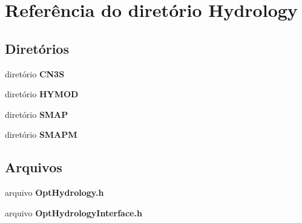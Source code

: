 \section{Referência do diretório Hydrology}
\label{dir_672a907a6201dd0551a98ef786e42bfc}
\subsection*{Diretórios}
\begin{DoxyCompactItemize}
\item 
diretório {\bf C\+N3S}
\item 
diretório {\bf H\+Y\+M\+OD}
\item 
diretório {\bf S\+M\+AP}
\item 
diretório {\bf S\+M\+A\+PM}
\end{DoxyCompactItemize}
\subsection*{Arquivos}
\begin{DoxyCompactItemize}
\item 
arquivo {\bf Opt\+Hydrology.\+h}
\item 
arquivo {\bf Opt\+Hydrology\+Interface.\+h}
\end{DoxyCompactItemize}
